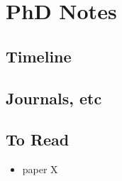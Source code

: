 %


\chapter{PhD Notes}

\section{Timeline}



\section{Journals, etc}


\section{To Read}

\begin{itemize}
    \item paper X 
\end{itemize}



